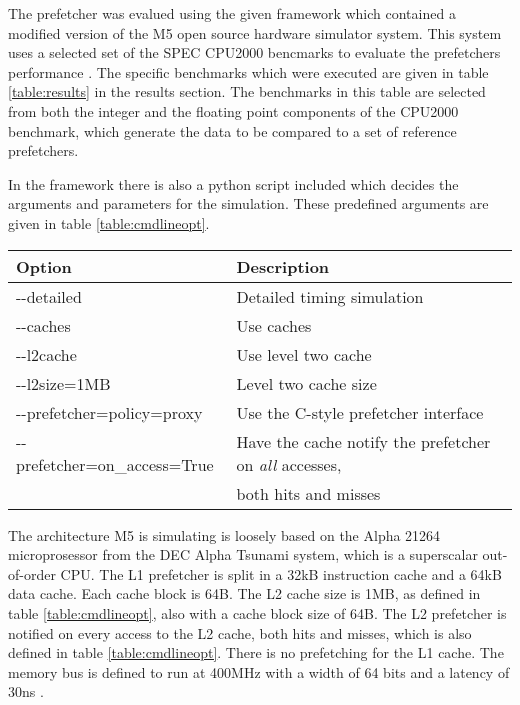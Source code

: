 The prefetcher was evalued using the given framework which contained a modified version of the M5 open source hardware simulator system. This system uses a selected set of the SPEC CPU2000 bencmarks to evaluate the prefetchers performance \cite{reference:spec}. The specific benchmarks which were executed are given in table \ref{table:results} in the results section. The benchmarks in this table are selected from both the integer and the floating point components of the CPU2000 benchmark, which generate the data to be compared to a set of reference prefetchers. 

In the framework there is also a python script included which decides the arguments and parameters for the simulation. These predefined arguments are given in table \ref{table:cmdlineopt}.

\begin{table*}[!t]
\renewcommand{\arraystretch}{1.3}
\caption{Python script command line options}
\label{table:cmdlineopt}
\centering
\begin{tabular}{l l}
\bfseries Option & \bfseries Description\\
\hline
-\--detailed & Detailed timing simulation\\
-\--caches & Use caches\\
-\--l2cache & Use level two cache\\
-\--l2size=1MB & Level two cache size\\
-\--prefetcher=policy=proxy & Use the C-style prefetcher interface\\
-\--prefetcher=on\_access=True & Have the cache notify the prefetcher on \emph{all} accesses,\\& both hits and misses\\
\hline
\end{tabular}
\end{table*}

The architecture M5 is simulating is loosely based on the Alpha 21264 microprosessor from the DEC Alpha Tsunami system, which is a superscalar out-of-order CPU. The L1 prefetcher is split in a 32kB instruction cache and a 64kB data cache. Each cache block is 64B. The L2 cache size is 1MB, as defined in table \ref{table:cmdlineopt}, also with a cache block size of 64B. The L2 prefetcher is notified on every access to the L2 cache, both hits and misses, which is also defined in table \ref{table:cmdlineopt}. There is no prefetching for the L1 cache. The memory bus is defined to run at 400MHz with a width of 64 bits and a latency of 30ns \cite{reference:opg}. 

